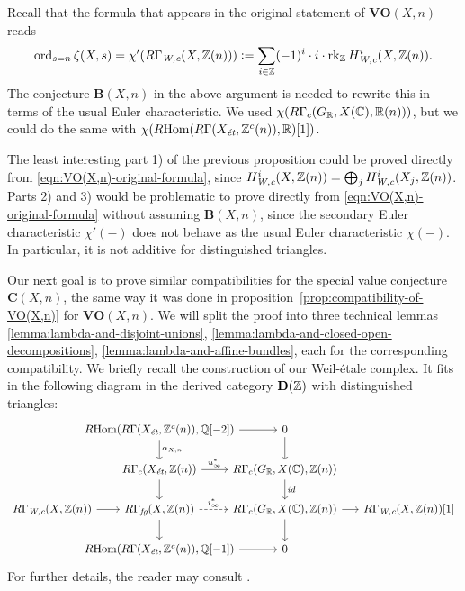 \documentclass{article}
\numberwithin{equation}{section}
\begin{document}
\begin{remark}
  Recall that the formula that appears in the original statement of
  $\mathbf{VO} (X,n)$ reads
  \begin{equation}
    \label{eqn:VO(X,n)-original-formula}
    \ord_{s=n} \zeta (X,s) = \chi' (R\Gamma_\Wc (X,\ZZ(n))) \dfn
    \sum_{i\in \ZZ} (-1)^i\cdot i \cdot \rk_\ZZ H^i_\Wc (X,\ZZ(n)).
  \end{equation}
  The conjecture $\mathbf{B} (X,n)$ in the above argument is needed to rewrite
  this in terms of the usual Euler characteristic. We used
  $\chi (R\Gamma_c (G_\RR, X (\CC), \RR (n)))$, but we could do the same with
  $\chi (\RHom (R\Gamma (X_\et, \ZZ^c (n)), \RR) [1])$.

  The least interesting part 1) of the previous proposition could be proved
  directly from \eqref{eqn:VO(X,n)-original-formula}, since
  $H^i_\Wc (X,\ZZ(n)) = \bigoplus_j H^i_\Wc (X_j,\ZZ(n))$. Parts 2) and 3) would
  be problematic to prove directly from \eqref{eqn:VO(X,n)-original-formula}
  without assuming $\mathbf{B} (X,n)$, since the secondary Euler characteristic
  $\chi' (-)$ does not behave as the usual Euler characteristic $\chi (-)$.
  In particular, it is not additive for distinguished triangles.
\end{remark}

Our next goal is to prove similar compatibilities for the special value
conjecture $\mathbf{C} (X,n)$, the same way it was done in
proposition~\ref{prop:compatibility-of-VO(X,n)} for $\mathbf{VO} (X,n)$.
We will split the proof into three technical lemmas
\ref{lemma:lambda-and-disjoint-unions},
\ref{lemma:lambda-and-closed-open-decompositions},
\ref{lemma:lambda-and-affine-bundles},
each for the corresponding compatibility. We briefly recall the construction of
our Weil-étale complex. It fits in the following diagram in the derived
category $\mathbf{D} (\ZZ)$ with distinguished triangles:
\[ \begin{tikzcd}[column sep=1.5em]
    &[-3em] \RHom (R\Gamma (X_\et, \ZZ^c (n)), \QQ [-2]) \ar{d}{\alpha_{X,n}} \ar{r} &[-2.5em] 0 \ar{d} \\
    & R\Gamma_c (X_\et, \ZZ(n)) \ar{d}\ar{r}{u_\infty^*} & R\Gamma_c (G_\RR, X (\CC), \ZZ(n))\ar{d}{id} \\
    R\Gamma_\Wc (X, \ZZ (n)) \ar{r} & R\Gamma_\fg (X, \ZZ(n)) \ar[dashed]{r}{i_\infty^*}\ar{d} & R\Gamma_c (G_\RR, X (\CC), \ZZ(n)) \ar{r} \ar{d} & R\Gamma_\Wc (X, \ZZ (n)) [1] \\
    & \RHom (R\Gamma (X_\et, \ZZ^c (n)), \QQ [-1]) \ar{r} & 0
\end{tikzcd} \]
For further details, the reader may consult \cite{Beshenov-Weil-etale-1}.
\end{document}
